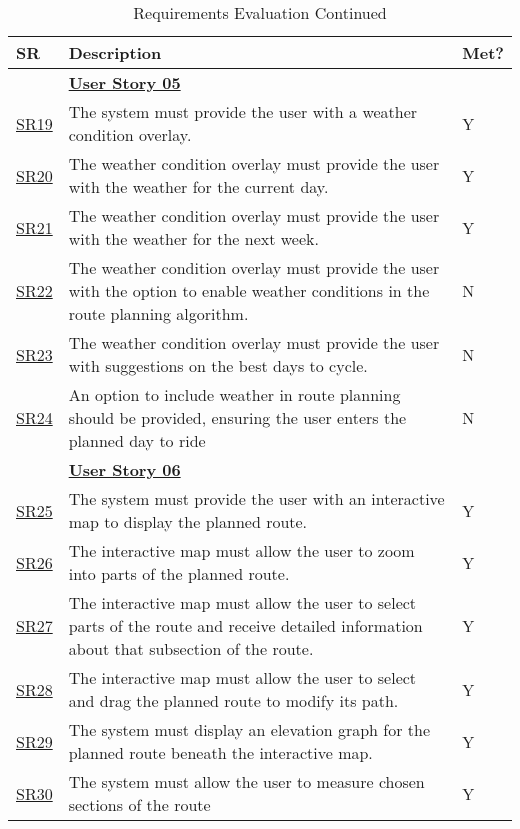 \begin{table}[!htb]
    \ContinuedFloat
    \caption{Requirements Evaluation Continued}
    \label{evaluatedrqextended}
    \small
    \begin{tabularx}{\textwidth}{ p{1cm} p{11cm} p{1cm} }
        \hline
        SR & Description & Met? \\ 
        \hline
        & \textbf{\hyperref[tab:user-story-05]{User Story 05}} \\
        \hyperref[SR:19]{SR19} & The system must provide the user with a weather condition overlay. & Y \\
        \hyperref[SR:20]{SR20} & The weather condition overlay must provide the user with the weather for the current day. & Y\\
        \hyperref[SR:21]{SR21} & The weather condition overlay must provide the user with the weather for the next week. & Y\\
        \hyperref[SR:22]{SR22} & The weather condition overlay must provide the user with the option to enable weather conditions in the route planning algorithm. & N\\ 
        \hyperref[SR:23]{SR23} & The weather condition overlay must provide the user with suggestions on the best days to cycle. & N\\
        \hyperref[SR:24]{SR24} & An option to include weather in route planning should be provided, ensuring the user enters the planned day to ride & N\\ 
        \hline
        & \textbf{\hyperref[tab:user-story-06]{User Story 06}}  \\
        \hyperref[SR:25]{SR25} & The system must provide the user with an interactive map to display the planned route. & Y \\
        \hyperref[SR:26]{SR26} & The interactive map must allow the user to zoom into parts of the planned route. & Y\\
        \hyperref[SR:27]{SR27} & The interactive map must allow the user to select parts of the route and receive detailed information about that subsection of the route. & Y\\
        \hyperref[SR:28]{SR28} & The interactive map must allow the user to select and drag the planned route to modify its path. & Y\\ 
        \hyperref[SR:29]{SR29} & The system must display an elevation graph for the planned route beneath the interactive map. & Y\\
        \hyperref[SR:30]{SR30} & The system must allow the user to measure chosen sections of the route & Y\\

\end{tabularx}
\end{table}
